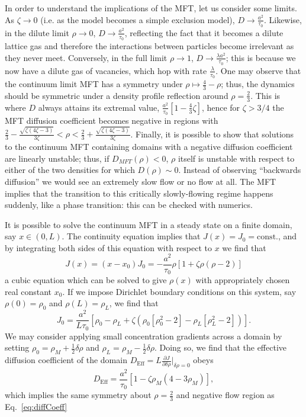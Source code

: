 \documentclass[
reprint,
 amsmath,amssymb,
 aps,
 prl
]{revtex4-1}
\newcommand{\partDeriv}[2]{\frac{\partial #1}{\partial #2}}
\begin{document}
In order to understand the implications of the MFT, let us consider
some limits. As $\zeta \rightarrow 0$ (i.e. as the model becomes a
simple exclusion model), $D \rightarrow \frac{a^2}{\tau_0}$. Likewise,
in the dilute limit $\rho \rightarrow 0$, $D \rightarrow \frac{
  a^2}{\tau_0}$, reflecting the fact that it becomes a dilute lattice
gas and therefore the interactions between particles become irrelevant
as they never meet.  Conversely, in the full limit $\rho \rightarrow
1$, $D \rightarrow \frac{\lambda a^2}{\tau_0}$; this is because we now
have a dilute gas of vacancies, which hop with rate
$\frac{\lambda}{\tau_0}$.  One may observe that the continuum limit
MFT has a symmetry under $\rho \mapsto \frac{4}{3} - \rho$; thus, the
dynamics should be symmetric under a density profile reflection around
$\rho = \frac{2}{3}$. This is where $D$ always attains its extremal
value, $ \frac{a^2}{\tau_0}\left[1 - \frac{4}{3}\zeta\right]$, hence
for $\zeta>3/4$ the MFT diffusion coefficient becomes negative in
regions with $\frac{2}{3} - \frac{\sqrt{\zeta\left(4\zeta -
    3\right)}}{3\zeta} < \rho < \frac{2}{3} +
\frac{\sqrt{\zeta\left(4\zeta - 3\right)}}{3\zeta}$.  Finally, it is
possible to show that solutions to the continuum MFT containing
domains with a negative diffusion coefficient are linearly unstable;
thus, if $D_{MFT}(\rho)<0$,   $\rho$ itself is unstable with respect to 
either of the two 
densities for which $D(\rho)\sim 0$. Instead of observing ``backwards
diffusion'' we would see an extremely slow flow or no flow at all. The
MFT implies that the transition to this critically slowly-flowing
regime happens suddenly, like a phase transition: this can be checked
with numerics.

It is possible to solve the continuum MFT in a steady state on a finite domain, say $x\in(0, L)$. The continuity equation implies that $J(x)=J_0=\mathrm{const.}$, and by integrating both sides of this equation with respect to $x$ we find that
\begin{equation}
 J(x) = (x-x_0)J_0 = -\frac{a^2}{\tau_0} \rho \left[1+\zeta \rho\left(\rho-2\right)\right] \label{cubic}
\end{equation}
a cubic equation which can be solved to give $\rho(x)$
with appropriately chosen real constant $x_0$. If we impose Dirichlet boundary conditions on this system, say $\rho(0)=\rho_0$ and $\rho(L)=\rho_L$, we find that
\begin{equation}
 J_0 = \frac{a^2}{L \tau_0} \left[ \rho_0 - \rho_L + \zeta \left( \rho_0\left[\rho_0^2-2\right] - \rho_L\left[\rho_L^2-2\right] \right) \right].
\end{equation}
We may consider applying small concentration gradients across a domain by setting $\rho_0 = \rho_M + \frac{1}{2}\delta\rho$ and $\rho_L = \rho_M - \frac{1}{2}\delta\rho$. Doing so, we find that the effective diffusion coefficient of the domain
$D_\mathrm{Eff}=L \partDeriv{J}{\delta\rho}\big|_{\delta\rho=0}$ obeys
\begin{equation}
\label{eq:MFTflow}
 D_\mathrm{Eff} = \frac{a^2}{ \tau_0} \left[ 1 - \zeta\rho_M(4-3\rho_M) \right],
\end{equation}
which implies the same symmetry about $\rho=\frac{2}{3}$ and negative
flow region as Eq.~\ref{eq:diffCoeff}
\end{document}

